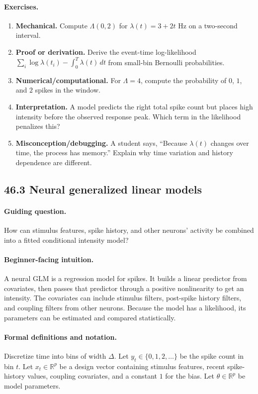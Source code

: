 \paragraph{Exercises.}
\begin{enumerate}[label=\textbf{46.2.\arabic*.}, leftmargin=*]
\item \textbf{Mechanical.} Compute \(\Lambda(0,2)\) for \(\lambda(t)=3+2t\) Hz on a two-second interval.
\item \textbf{Proof or derivation.} Derive the event-time log-likelihood \(\sum_i\log\lambda(t_i)-\int_0^T\lambda(t)\,dt\) from small-bin Bernoulli probabilities.
\item \textbf{Numerical/computational.} For \(\Lambda=4\), compute the probability of \(0\), \(1\), and \(2\) spikes in the window.
\item \textbf{Interpretation.} A model predicts the right total spike count but places high intensity before the observed response peak. Which term in the likelihood penalizes this?
\item \textbf{Misconception/debugging.} A student says, ``Because \(\lambda(t)\) changes over time, the process has memory.'' Explain why time variation and history dependence are different.
\end{enumerate}

\subsection{46.3 Neural generalized linear models}

\paragraph{Guiding question.}
How can stimulus features, spike history, and other neurons' activity be combined into a fitted conditional intensity model?

\paragraph{Beginner-facing intuition.}
A neural GLM is a regression model for spikes. It builds a linear predictor from covariates, then passes that predictor through a positive nonlinearity to get an intensity. The covariates can include stimulus filters, post-spike history filters, and coupling filters from other neurons. Because the model has a likelihood, its parameters can be estimated and compared statistically.

\paragraph{Formal definitions and notation.}
Discretize time into bins of width \(\Delta\). Let \(y_t\in\{0,1,2,\ldots\}\) be the spike count in bin \(t\). Let \(x_t\in\mathbb{R}^p\) be a design vector containing stimulus features, recent spike-history values, coupling covariates, and a constant \(1\) for the bias. Let \(\theta\in\mathbb{R}^p\) be model parameters.

